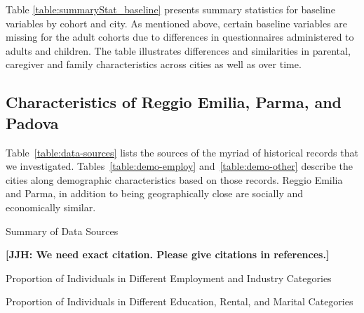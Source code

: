 Table \ref{table:summaryStat_baseline} presents summary statistics for baseline variables by cohort and city. As mentioned above, certain baseline variables are missing for the adult cohorts due to differences in questionnaires administered to adults and children. The table illustrates differences and similarities in parental, caregiver and family characteristics across cities as well as over time.

\begin{landscape}

\end{landscape}

\subsection{Characteristics of Reggio Emilia, Parma, and Padova}
\label{app:characteristics-cities}

Table~\ref{table:data-sources} lists the sources of the myriad of historical records that we investigated. Tables~\ref{table:demo-employ} and~\ref{table:demo-other} describe the cities along demographic characteristics based on those records. Reggio Emilia and Parma, in addition to being geographically close are socially and economically similar.

\begin{table}[H]
\centering
	\caption{Summary of Data Sources} \label{table:data-sources}
	
\end{table}

\textbf{[JJH: We need exact citation. Please give citations in references.]}

\begin{landscape}
\begin{table}[ht!]
\begin{center}
\scriptsize{
	\caption{Proportion of Individuals in Different Employment and Industry Categories} \label{table:demo-employ}
	
}
\end{center}
\end{table}
\end{landscape}

\begin{landscape}
\begin{table}[ht!]
\begin{center}
\scriptsize{
	\caption{Proportion of Individuals in Different Education, Rental, and Marital Categories} \label{table:demo-other}
	
}
\end{center}
\end{table}
\end{landscape}



